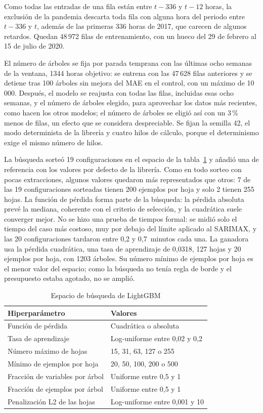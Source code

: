 Como todas las entradas de una fila están entre $t-336$ y $t-12$ horas, la
exclusión de la pandemia descarta toda fila con alguna hora del periodo entre
$t-336$ y $t$, además de las primeras 336 horas de 2017, que carecen de
algunos retardos. Quedan 48\,972 filas de entrenamiento, con un hueco del 29 de
febrero al 15 de julio de 2020.

El número de árboles se fija por parada temprana con las últimas ocho semanas
de la ventana, 1344 horas objetivo: se entrena con las 47\,628 filas
anteriores y se detiene tras 100 árboles sin mejora del MAE en el control,
con un máximo de 10\,000. Después, el modelo se reajusta con todas las filas,
incluidas esas ocho semanas, y el número de árboles elegido, para aprovechar
los datos más recientes, como hacen los otros modelos; el número de árboles
se eligió así con un 3\,\% menos de filas, un efecto que se considera
despreciable. Se fijan la semilla 42,
el modo determinista de la librería y cuatro hilos de cálculo, porque el
determinismo exige el mismo número de hilos.

La búsqueda sorteó 19 configuraciones en el espacio de la
tabla~\ref{tab:espacio-lgbm} y añadió una de referencia con los valores por
defecto de la librería. Como en todo sorteo con pocas extracciones, algunos
valores quedaron más representados que otros: 7 de las 19 configuraciones
sorteadas tienen 200 ejemplos por hoja y solo 2 tienen 255 hojas. La función de pérdida forma parte de la búsqueda: la
pérdida absoluta prevé la mediana, coherente con el criterio de selección, y
la cuadrática suele converger mejor. No se hizo una prueba de tiempos formal:
se midió solo el tiempo del caso más costoso, muy por debajo del límite
aplicado al SARIMAX, y las 20 configuraciones tardaron entre 0,2 y
0,7~minutos cada una. La ganadora usa la pérdida cuadrática, una tasa de aprendizaje de
0,0318, 127 hojas y 20 ejemplos por hoja, con 1203 árboles. Su número mínimo
de ejemplos por hoja es el menor valor del espacio; como la búsqueda no
tenía regla de borde y el presupuesto estaba agotado, no se amplió.

\begin{table}[htbp]
	\centering
	\caption{Espacio de búsqueda de LightGBM}
	\label{tab:espacio-lgbm}
	\small
	\begin{tabular}{ll}
		\hline
		\textbf{Hiperparámetro} & \textbf{Valores} \\
		\hline
		Función de pérdida & Cuadrática o absoluta \\
		Tasa de aprendizaje & Log-uniforme entre 0,02 y 0,2 \\
		Número máximo de hojas & 15, 31, 63, 127 o 255 \\
		Mínimo de ejemplos por hoja & 20, 50, 100, 200 o 500 \\
		Fracción de variables por árbol & Uniforme entre 0,5 y 1 \\
		Fracción de ejemplos por árbol & Uniforme entre 0,5 y 1 \\
		Penalización L2 de las hojas & Log-uniforme entre 0,001 y 10 \\
		\hline
	\end{tabular}
\end{table}

